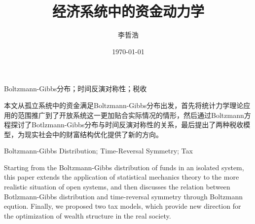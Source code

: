 \documentclass[tsinghuacite]{HustGraduPaper}
\title{经济系统中的资金动力学} %
\author{李哲浩} %
\date{\today} %
\begin{document}
	\maketitle
	
	\statement
	
	\clearpage %
	
	\begin{cnabstract}{Boltzmann-Gibbs分布；时间反演对称性；税收}
		
		本文从孤立系统中的资金满足Boltzmann-Gibbs分布出发，首先将统计力学理论应用的范围推广到了开放系统这一更加贴合实际情况的情形，然后通过Boltzmann方程探讨了Botlzmann-Gibbs分布与时间反演对称性的关系，最后提出了两种税收模型，为现实社会中的财富结构优化提供了新的方向。
		
		
	\end{cnabstract}
	
	
	\begin{enabstract}{Boltzmann-Gibbs Distribution; Time-Reversal Symmetry; Tax}
		
		Starting from the Boltzmann-Gibbs distribution of funds in an isolated system, this paper extends the application of statistical mechanics theory to the more realistic situation of open systems, and then discusses the relation between Botlzmann-Gibbs distribution and time-reversal symmetry through Boltzmann eqution. Finally, we proposed two tax models, which provide new direction for the optimization of wealth structure in the real society.
		
	\end{enabstract}
	
\end{document}
